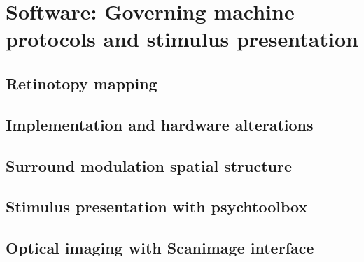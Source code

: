 \section{Software: Governing machine protocols and stimulus presentation}
\label{sec:sectiond}

\subsection{Retinotopy mapping}
\label{subsec:subasectionD}

\subsection{Implementation and hardware alterations}
\label{subsec:subbsectionD}

\subsection{Surround modulation spatial structure}
\label{subsec:subcsectionD}

\subsection{Stimulus presentation with psychtoolbox}
\label{subsec:subdsectionD}

\subsection{Optical imaging with Scanimage interface}
\label{subsec:subesectionD}